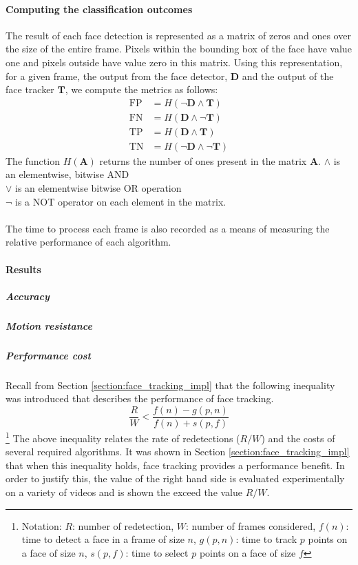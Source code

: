 \paragraph{Computing the classification outcomes} The result of each face detection is represented as a matrix of zeros and ones over the size of the entire frame.
Pixels within the bounding box of the face have value one and pixels outside have value zero in this matrix. Using this representation, for a given frame, the output from the face detector, $\mathbf{D}$ and the output of the face tracker $\mathbf{T}$, we compute the metrics as follows: 
\begin{align*}
    \mathrm{FP} &= H(\neg{\mathbf{D}} \wedge \mathbf{T}) \\
    \mathrm{FN} &= H(\mathbf{D} \wedge \neg{\mathbf{T}})\\
    \mathrm{TP} &= H(\mathbf{D} \wedge \mathbf{T})\\
    \mathrm{TN} &= H(\neg{\mathbf{D}} \wedge \neg{\mathbf{T}})
\end{align*}
The function $H(\mathbf{A})$ returns the number of ones present in the matrix $\mathbf{A}$. $\wedge$ is an elementwise, bitwise AND \\ $\vee$ is an elementwise bitwise OR operation \\ $\neg$ is a NOT operator on each element in the matrix.
\\\\
The time to process each frame is also recorded as a means of measuring the relative performance of each algorithm.
\paragraph{Results}

\subparagraph{Accuracy}
\subparagraph{Motion resistance}

\subparagraph{Performance cost}
Recall from Section \ref{section:face_tracking_impl} that the following inequality was introduced that describes the performance of face tracking.
\begin{equation*}
    \frac{R}{W} < \frac{f(n)-g(p,n)}{f(n)+s(p,f)}
\end{equation*}\footnote{Notation: $R$: number of redetection, $W$: number of frames considered, $f(n)$: time to detect a face in a frame of size $n$, $g(p,n)$: time to track $p$ points on a face of size $n$, $s(p,f)$: time to select $p$ points on a face of size $f$ }
The above inequality relates the rate of redetections ($R/W$) and the costs of several required algorithms. It was shown in Section \ref{section:face_tracking_impl} that when this inequality holds, face tracking provides a performance benefit.
In order to justify this, the value of the right hand side is evaluated experimentally on a variety of videos and is shown the exceed the value $R/W$.



